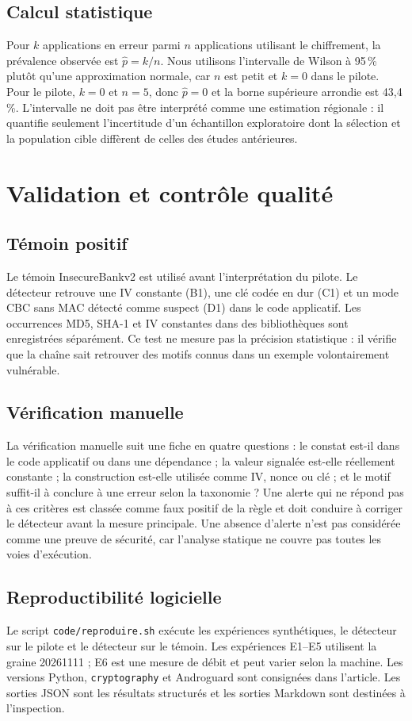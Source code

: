 \documentclass[conference,a4paper]{IEEEtran}
\begin{document}
\subsection{Calcul statistique}
Pour $k$ applications en erreur parmi $n$ applications utilisant le chiffrement, la prévalence observée est $\hat p=k/n$. Nous utilisons l'intervalle de Wilson à 95\,\% plutôt qu'une approximation normale, car $n$ est petit et $k=0$ dans le pilote. Pour le pilote, $k=0$ et $n=5$, donc $\hat p=0$ et la borne supérieure arrondie est 43,4\,\%. L'intervalle ne doit pas être interprété comme une estimation régionale : il quantifie seulement l'incertitude d'un échantillon exploratoire dont la sélection et la population cible diffèrent de celles des études antérieures.

\section{Validation et contrôle qualité}

\subsection{Témoin positif}
Le témoin InsecureBankv2 est utilisé avant l'interprétation du pilote. Le détecteur retrouve une IV constante (B1), une clé codée en dur (C1) et un mode CBC sans MAC détecté comme suspect (D1) dans le code applicatif. Les occurrences MD5, SHA-1 et IV constantes dans des bibliothèques sont enregistrées séparément. Ce test ne mesure pas la précision statistique : il vérifie que la chaîne sait retrouver des motifs connus dans un exemple volontairement vulnérable.

\subsection{Vérification manuelle}
La vérification manuelle suit une fiche en quatre questions : le constat est-il dans le code applicatif ou dans une dépendance ; la valeur signalée est-elle réellement constante ; la construction est-elle utilisée comme IV, nonce ou clé ; et le motif suffit-il à conclure à une erreur selon la taxonomie ? Une alerte qui ne répond pas à ces critères est classée comme faux positif de la règle et doit conduire à corriger le détecteur avant la mesure principale. Une absence d'alerte n'est pas considérée comme une preuve de sécurité, car l'analyse statique ne couvre pas toutes les voies d'exécution.

\subsection{Reproductibilité logicielle}
Le script \texttt{code/reproduire.sh} exécute les expériences synthétiques, le détecteur sur le pilote et le détecteur sur le témoin. Les expériences E1--E5 utilisent la graine 20261111 ; E6 est une mesure de débit et peut varier selon la machine. Les versions Python, \texttt{cryptography} et Androguard sont consignées dans l'article. Les sorties JSON sont les résultats structurés et les sorties Markdown sont destinées à l'inspection.
\end{document}
